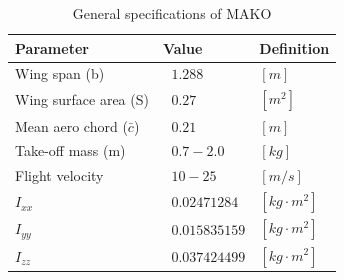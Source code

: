  \begin{table}
\caption{General specifications of MAKO \cite{bronz2016aerodynamic}}
\label{arm:MAKOspecs}
\begin{center}
\begin{tabular}{ ||p{4cm}|p{3cm}|p{2cm}||}\hline
\textbf{Parameter} & \textbf{Value} & \textbf{Definition} \\\hline
Wing span (b)                  & $\ \ \, 1.288 $	   & $[m]$ \\\hline
Wing surface area (S)      & $ \ \ \, 0.27 $           &  $[m^2]$ \\\hline
Mean aero chord ($\bar{c}$)         & $\ \ \, 0.21$           & $[m]$ \\\hline
Take-off mass (m)             & $\ \ \, 0.7 - 2.0$       & $[kg]$ \\\hline
Flight velocity           & $\ \ \, 10 - 25$       & $[m/s]$ \\\hline
$I_{xx}$                         & $\ \ \, 0.02471284$   & $[kg \cdot m^2]$ \\\hline
$I_{yy}$                         & $\ \ \, 0.015835159$   & $[kg \cdot m^2]$ \\\hline
$I_{zz}$                         & $\ \ \, 0.037424499$   & $[kg \cdot m^2]$ \\\hline
\end{tabular}
\end{center}
\end{table}

